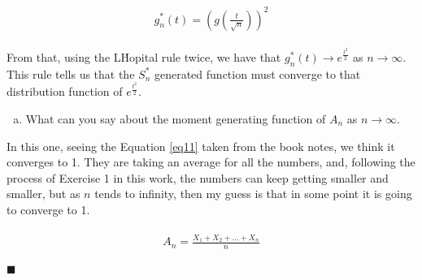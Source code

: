 \documentclass{article}
\begin{document}
\begin{eqnarray}
\label{eq10}
\begin{split}
g_n^*(t) = \left( g \left( \frac{t}{\sqrt{n}} \right) \right)^2
\end{split}
\end{eqnarray}

From that, using the L\' Hopital rule twice, we have that $g_n^*(t) \rightarrow e^{\frac{t^2}{2}}$ as $n \rightarrow \infty$. This rule tells us that the $S_n^*$ generated function must converge to that distribution function of $e^{\frac{t^2}{2}}$.


\begin{enumerate}[(d)]
\item What can you say about the moment generating function of $A_n$ as $n \rightarrow \infty$.
\end{enumerate}

In this one, seeing the Equation \ref{eq11} taken from the book notes, we think it converges to 1. They are taking an average for all the numbers, and, following the process of Exercise 1 in this work, the numbers can keep getting smaller and smaller, but as $n$ tends to infinity, then my guess is that in some point it is going to converge to 1.

\begin{eqnarray}
\label{eq11}
\begin{split}
A_n = \frac{X_1 + X_2 + ... + X_n}{n}
\end{split}
\end{eqnarray}

\begin{flushright}
$\blacksquare$
\end{flushright}





 
\end{document}
